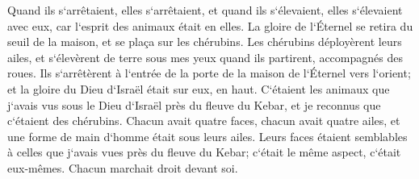 \verse Quand ils s`arrêtaient, elles s`arrêtaient, et quand ils s`élevaient, elles s`élevaient avec eux, car l`esprit des animaux était en elles. 
\verse La gloire de l`Éternel se retira du seuil de la maison, et se plaça sur les chérubins. 
\verse Les chérubins déployèrent leurs ailes, et s`élevèrent de terre sous mes yeux quand ils partirent, accompagnés des roues. Ils s`arrêtèrent à l`entrée de la porte de la maison de l`Éternel vers l`orient; et la gloire du Dieu d`Israël était sur eux, en haut. 
\verse C`étaient les animaux que j`avais vus sous le Dieu d`Israël près du fleuve du Kebar, et je reconnus que c`étaient des chérubins. 
\verse Chacun avait quatre faces, chacun avait quatre ailes, et une forme de main d`homme était sous leurs ailes. 
\verse Leurs faces étaient semblables à celles que j`avais vues près du fleuve du Kebar; c`était le même aspect, c`était eux-mêmes. Chacun marchait droit devant soi. 

\chapter{}

